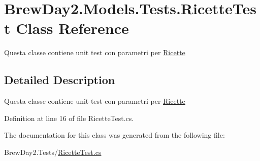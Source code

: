 \hypertarget{class_brew_day2_1_1_models_1_1_tests_1_1_ricette_test}{}\section{Brew\+Day2.\+Models.\+Tests.\+Ricette\+Test Class Reference}
\label{class_brew_day2_1_1_models_1_1_tests_1_1_ricette_test}


Questa classe contiene unit test con parametri per \mbox{\hyperlink{class_brew_day2_1_1_models_1_1_ricette}{Ricette}} 




\subsection{Detailed Description}
Questa classe contiene unit test con parametri per \mbox{\hyperlink{class_brew_day2_1_1_models_1_1_ricette}{Ricette}}



Definition at line 16 of file Ricette\+Test.\+cs.



The documentation for this class was generated from the following file\+:\begin{DoxyCompactItemize}
\item 
Brew\+Day2.\+Tests/\mbox{\hyperlink{_ricette_test_8cs}{Ricette\+Test.\+cs}}\end{DoxyCompactItemize}
